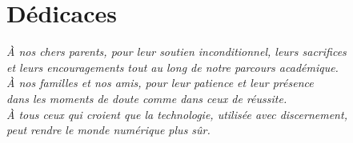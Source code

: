 \chapter*{Dédicaces}

\begin{center}
\itshape
À nos chers parents, pour leur soutien inconditionnel, leurs sacrifices\\
et leurs encouragements tout au long de notre parcours académique.\\[0.5cm]

À nos familles et nos amis, pour leur patience et leur présence\\
dans les moments de doute comme dans ceux de réussite.\\[0.5cm]

À tous ceux qui croient que la technologie, utilisée avec discernement,\\
peut rendre le monde numérique plus sûr.
\end{center}
